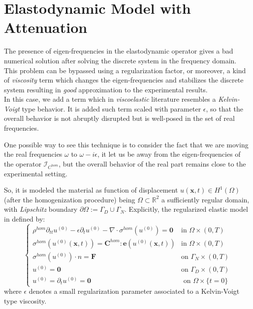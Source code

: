 \section{Elastodynamic Model with Attenuation}
The presence of eigen-frequencies in the elastodynamic operator gives a bad numerical solution after solving the discrete system in the frequency domain. This problem can be bypassed using a regularization factor, or moreover, a kind of \textit{viscosity} term which changes the eigen-frequencies and stabilizes the discrete system resulting in \textit{good} approximation to the experimental results.\\
In this case, we add a term which in \textit{viscoelastic} literature resembles a \textit{Kelvin-Voigt} type behavior. It is added such term scaled with parameter $\epsilon$, so that the overall behavior is not abruptly disrupted but is well-posed in the set of real frequencies.

\begin{rem}
One possible way to see this technique is to consider the fact that we are moving the real frequencies $\omega$ to $\omega - i\epsilon$, it let us be away from the eigen-frequencies of the operator $\mathcal{I}_{C^{hom}}$, but the overall behavior of the real part remains close to the experimental setting.
\end{rem}

So, it is modeled the material as function of displacement $u(\mathbf{x},t) \in H^{1}(\Omega)$ (after the homogenization procedure) being $\Omega \subset \mathbb{R}^2$ a sufficiently regular domain, with \textit{Lipschitz} boundary $\partial \Omega := \Gamma_D \cup \Gamma_N$. 
Explicitly, the regularized elastic model in defined by:
\begin{equation*}
    \left \{
    \begin{array}{cc}
        \rho^{hom} \partial_{tt} u^{(0)} - \epsilon \partial_{t} u^{(0)} - \nabla \cdot \sigma^{hom}(u^{(0)}) = \mathbf{0} & \text{in } \Omega \times (0,T) \\
        \sigma^{hom}(u^{(0)}(\mathbf{x},t)) =  \mathbf{C}^{hom}:\mathbf{e}(u^{(0)}(\mathbf{x},t))  & \text{in }\Omega \times (0,T)\\ 
        \sigma^{hom}(u^{(0)})\cdot n = \mathbf{F} & \text{on }\Gamma_N\times (0,T) \\
        u^{(0)} = \mathbf{0} & \text{on }\Gamma_D \times (0,T) \\
        u^{(0)} = \partial_t u^{(0)} = \mathbf{0}& \text{ on } \Omega \times \{t=0\}
    \end{array}
    \right .
\end{equation*}
where $\epsilon$ denotes a small regularization parameter associated to a Kelvin-Voigt type viscosity. 
